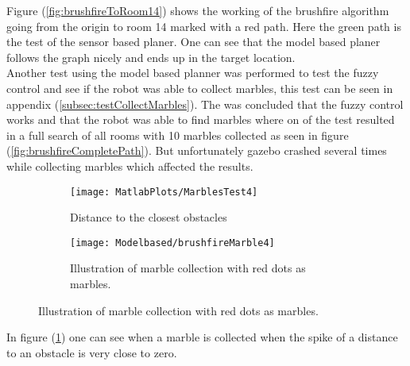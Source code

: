 \documentclass[../Head/Main.tex]{subfiles}
\begin{document}
Figure (\ref{fig:brushfireToRoom14}) shows the working of the brushfire algorithm going from the origin to room 14 marked with a red path. Here the green path is the test of the sensor based planer. One can see that the model based planer follows the graph nicely and ends up in the target location.\\ 
Another test using the model based planner was performed to test the fuzzy control and see if the robot was able to collect marbles, this test can be seen in appendix (\ref{subsec:testCollectMarbles}). The was concluded that the fuzzy control works and that the robot was able to find marbles where on of the test resulted in a full search of all rooms with 10 marbles collected as seen in figure (\ref{fig:brushfireCompletePath}). But unfortunately gazebo crashed several times while collecting marbles which affected the results.
  \begin{figure}[H]
   \begin{subfigure}[b]{0.49\textwidth}
    \centering
    \texttt{[image: MatlabPlots/MarblesTest4]}
    \caption{Distance to the closest obstacles}
    \label{fig:matlabPlotMarbletest14}
  \end{subfigure}
  \hfill
   \begin{subfigure}[b]{0.49\textwidth}
    \centering
    \texttt{[image: Modelbased/brushfireMarble4]}
    \caption{Illustration of marble collection with red dots as marbles.}
    \label{fig:brushfireMarbleFindingTest}
  \end{subfigure}
  \end{figure}  

In figure (\ref{fig:matlabPlotMarbletest14}) one can see when a marble is collected when the spike of a distance to an obstacle is very close to zero.
\end{document}
